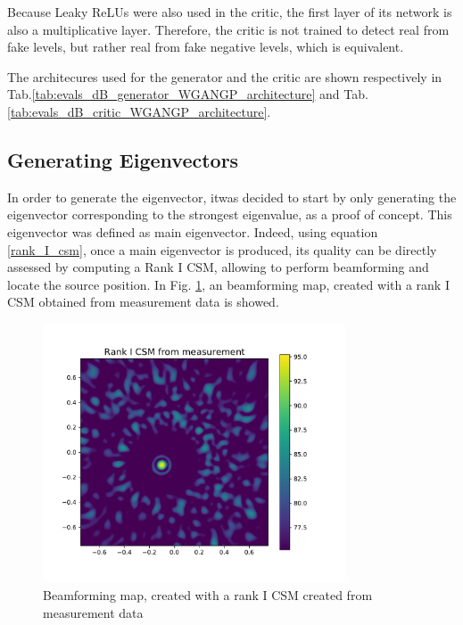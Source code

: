 \documentclass[11pt,a4paper,twoside]{report}
\begin{document}
Because Leaky ReLUs were also used in the critic, the first layer of its network is also a multiplicative layer. Therefore, the critic is not trained to detect real from fake levels, but rather real from fake negative levels, which is equivalent. 

The architecures used for the generator and the critic are shown respectively in Tab.\ref{tab:evals_dB_generator_WGANGP_architecture} and Tab.\ref{tab:evals_dB_critic_WGANGP_architecture}.


\subsection{Generating Eigenvectors}

In order to generate the eigenvector, itwas decided to start by only generating the eigenvector corresponding to the strongest eigenvalue, as a proof of concept. This eigenvector was defined as main eigenvector. Indeed, using equation \ref{rank_I_csm}, once a main eigenvector is produced, its quality can be directly assessed by computing a Rank I CSM, allowing to perform beamforming and locate the source position. In Fig. \ref{fig:measurement_sample_rank_I_beamforming}, an beamforming map, created with a rank I CSM obtained from measurement data is showed.

\begin{figure}
    \centering
    \includegraphics[width=0.8\textwidth]{figs/measurement_sample_rank_I_beamforming.pdf}
    \caption{Beamforming map, created with a rank I CSM created from measurement data}
    \label{fig:measurement_sample_rank_I_beamforming}
\end{figure}
\end{document}
